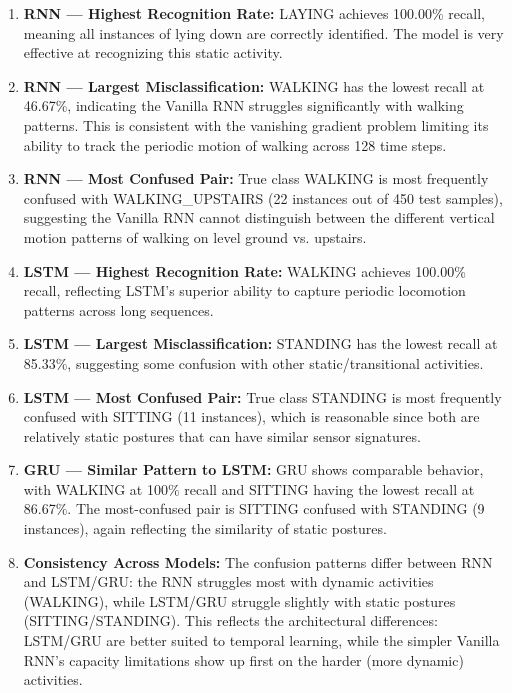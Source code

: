 \documentclass[10pt]{article}
\begin{document}
\begin{enumerate}
\item \textbf{RNN --- Highest Recognition Rate:} LAYING achieves 100.00\% recall, meaning all instances 
of lying down are correctly identified. The model is very effective at recognizing this static activity.

\item \textbf{RNN --- Largest Misclassification:} WALKING has the lowest recall at 46.67\%, indicating 
the Vanilla RNN struggles significantly with walking patterns. This is consistent with the vanishing 
gradient problem limiting its ability to track the periodic motion of walking across 128 time steps.

\item \textbf{RNN --- Most Confused Pair:} True class WALKING is most frequently confused with 
WALKING\_UPSTAIRS (22 instances out of 450 test samples), suggesting the Vanilla RNN cannot distinguish 
between the different vertical motion patterns of walking on level ground vs. upstairs.

\item \textbf{LSTM --- Highest Recognition Rate:} WALKING achieves 100.00\% recall, reflecting LSTM's 
superior ability to capture periodic locomotion patterns across long sequences.

\item \textbf{LSTM --- Largest Misclassification:} STANDING has the lowest recall at 85.33\%, suggesting 
some confusion with other static/transitional activities.

\item \textbf{LSTM --- Most Confused Pair:} True class STANDING is most frequently confused with SITTING 
(11 instances), which is reasonable since both are relatively static postures that can have similar sensor 
signatures.

\item \textbf{GRU --- Similar Pattern to LSTM:} GRU shows comparable behavior, with WALKING at 100\% 
recall and SITTING having the lowest recall at 86.67\%. The most-confused pair is SITTING confused with 
STANDING (9 instances), again reflecting the similarity of static postures.

\item \textbf{Consistency Across Models:} The confusion patterns differ between RNN and LSTM/GRU: the 
RNN struggles most with dynamic activities (WALKING), while LSTM/GRU struggle slightly with static 
postures (SITTING/STANDING). This reflects the architectural differences: LSTM/GRU are better suited to 
temporal learning, while the simpler Vanilla RNN's capacity limitations show up first on the harder 
(more dynamic) activities.
\end{enumerate}
\end{document}

